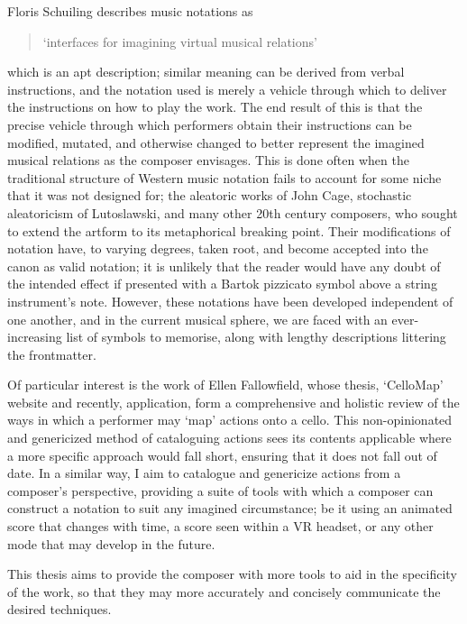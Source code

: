 Floris Schuiling describes music notations as \begin{quotation}
`interfaces for imagining virtual musical relations'
\end{quotation}
which is an apt description; similar meaning can be derived from verbal instructions, and the notation used is merely a vehicle through which to deliver the instructions on how to play the work.
The end result of this is that the precise vehicle through which performers obtain their instructions can be modified, mutated, and otherwise changed to better represent the imagined musical relations as the composer envisages.
This is done often when the traditional structure of Western music notation fails to account for some niche that it was not designed for; the aleatoric works of John Cage, stochastic aleatoricism of Lutoslawski, and many other 20th century composers, who sought to extend the artform to its metaphorical breaking point.
Their modifications of notation have, to varying degrees, taken root, and become accepted into the canon as valid notation; it is unlikely that the reader would have any doubt of the intended effect if presented with a Bartok pizzicato symbol above a string instrument's note.
However, these notations have been developed independent of one another, and in the current musical sphere, we are faced with an ever-increasing list of symbols to memorise, along with lengthy descriptions littering the frontmatter.


Of particular interest is the work of Ellen Fallowfield, whose thesis, `CelloMap' website and recently, application, form a comprehensive and holistic review of the ways in which a performer may `map' actions onto a cello.\autocite[]{fallowfieldCelloMapHandbook2009,fallowfieldCelloMap}
This non-opinionated and genericized method of cataloguing actions sees its contents applicable where a more specific approach would fall short, ensuring that it does not fall out of date.
In a similar way, I aim to catalogue and genericize actions from a composer's perspective, providing a suite of tools with which a composer can construct a notation to suit any imagined circumstance; be it using an animated score that changes with time, a score seen within a VR headset, or any other mode that may develop in the future.

This thesis aims to provide the composer with more tools to aid in the specificity of the work, so that they may more accurately and concisely communicate the desired techniques.